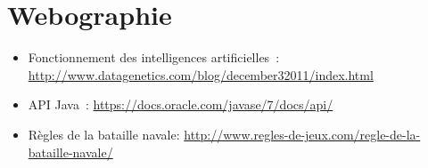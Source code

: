 \begin{appendices}
\begin{itemize}
   
\end{itemize}


\newpage
\section{Webographie}
\begin{itemize}
	\item Fonctionnement des intelligences artificielles~: \url{http://www.datagenetics.com/blog/december32011/index.html}
\newline	
	\item API Java~: \url{https://docs.oracle.com/javase/7/docs/api/}
	\newline
	\item Règles de la bataille navale: \url{http://www.regles-de-jeux.com/regle-de-la-bataille-navale/}
\end{itemize}

\newpage


\end{appendices}
